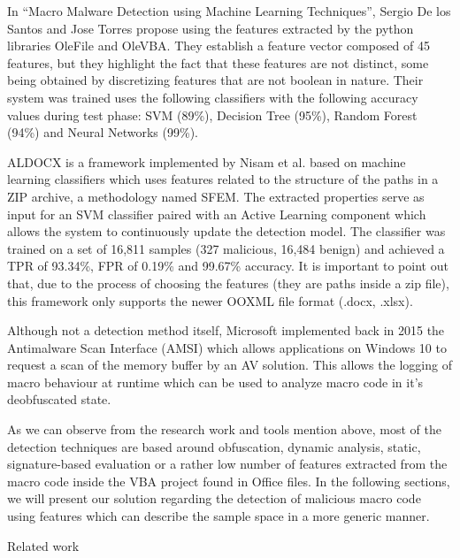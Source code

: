 In “Macro Malware Detection using Machine Learning Techniques”, Sergio De los Santos and Jose Torres propose using the features extracted by the python libraries OleFile and OleVBA. They establish a feature vector composed of 45 features, but they highlight the fact that these features are not distinct, some being obtained by discretizing features that are not boolean in nature. Their system was trained  uses the following classifiers with the following accuracy values during test phase: SVM (89\%),  Decision Tree (95\%), Random Forest (94\%) and Neural Networks (99\%). 
\par
ALDOCX is a framework implemented by Nisam et al. based on machine learning classifiers which uses features related to the structure of the paths in a ZIP archive, a methodology named SFEM. The extracted properties serve as input for an SVM classifier paired with an Active Learning component which allows the system to continuously update the detection model. The classifier was trained on a set of 16,811 samples (327 malicious, 16,484 benign) and achieved a TPR of 93.34\%, FPR of 0.19\% and 99.67\% accuracy. It is important to point out that, due to the process of choosing the features (they are paths inside a zip file), this framework only supports the newer OOXML file format (.docx, .xlsx).
\par
Although not a detection method itself, Microsoft implemented back in 2015 the Antimalware Scan Interface (AMSI) which allows applications on Windows 10 to request a scan of the memory buffer by an AV solution. This allows the logging of macro behaviour at runtime which can be used to analyze macro code in it’s deobfuscated state.
\par
As we can observe from the research work and tools mention above, most of the detection techniques are based around obfuscation, dynamic analysis, static, signature-based evaluation or a rather low number of features extracted from the macro code inside the VBA project found in Office files.
In the following sections, we will present our solution regarding the detection of malicious macro code using features which can describe the sample space in a more generic manner.

Related work